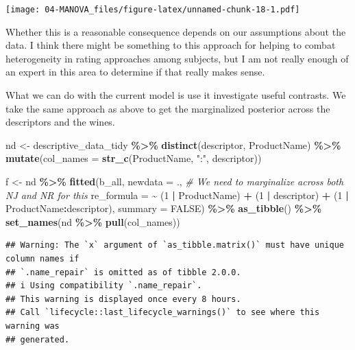 \documentclass[
]{book}
\newenvironment{Shaded}{\begin{snugshade}}{\end{snugshade}}
\newcommand{\AttributeTok}[1]{\textcolor[rgb]{0.13,0.29,0.53}{#1}}
\newcommand{\CommentTok}[1]{\textcolor[rgb]{0.56,0.35,0.01}{\textit{#1}}}
\newcommand{\ConstantTok}[1]{\textcolor[rgb]{0.56,0.35,0.01}{#1}}
\newcommand{\DecValTok}[1]{\textcolor[rgb]{0.00,0.00,0.81}{#1}}
\newcommand{\FunctionTok}[1]{\textcolor[rgb]{0.13,0.29,0.53}{\textbf{#1}}}
\newcommand{\NormalTok}[1]{#1}
\newcommand{\OtherTok}[1]{\textcolor[rgb]{0.56,0.35,0.01}{#1}}
\newcommand{\SpecialCharTok}[1]{\textcolor[rgb]{0.81,0.36,0.00}{\textbf{#1}}}
\newcommand{\StringTok}[1]{\textcolor[rgb]{0.31,0.60,0.02}{#1}}
\begin{document}
\texttt{[image: 04-MANOVA\_files/figure-latex/unnamed-chunk-18-1.pdf]}

Whether this is a reasonable consequence depends on our assumptions about the data. I think there might be something to this approach for helping to combat heterogeneity in rating approaches among subjects, but I am not really enough of an expert in this area to determine if that really makes sense.

What we can do with the current model is use it investigate useful contrasts. We take the same approach as above to get the marginalized posterior across the descriptors and the wines.

\begin{Shaded}
\begin{Highlighting}[]
\NormalTok{nd }\OtherTok{\textless{}{-}}
\NormalTok{  descriptive\_data\_tidy }\SpecialCharTok{\%\textgreater{}\%}
  \FunctionTok{distinct}\NormalTok{(descriptor, ProductName) }\SpecialCharTok{\%\textgreater{}\%}
  \FunctionTok{mutate}\NormalTok{(}\AttributeTok{col\_names =} \FunctionTok{str\_c}\NormalTok{(ProductName, }\StringTok{":"}\NormalTok{, descriptor)) }


\NormalTok{f }\OtherTok{\textless{}{-}}
\NormalTok{  nd }\SpecialCharTok{\%\textgreater{}\%}
  \FunctionTok{fitted}\NormalTok{(b\_all, }
         \AttributeTok{newdata =}\NormalTok{ .,}
         \CommentTok{\# We need to marginalize across both \textasciigrave{}NJ\textasciigrave{} and \textasciigrave{}NR\textasciigrave{} for this}
         \AttributeTok{re\_formula =} \SpecialCharTok{\textasciitilde{}}\NormalTok{ (}\DecValTok{1} \SpecialCharTok{|}\NormalTok{ ProductName) }\SpecialCharTok{+}\NormalTok{ (}\DecValTok{1} \SpecialCharTok{|}\NormalTok{ descriptor) }\SpecialCharTok{+}\NormalTok{ (}\DecValTok{1} \SpecialCharTok{|}\NormalTok{ ProductName}\SpecialCharTok{:}\NormalTok{descriptor),}
         \AttributeTok{summary =} \ConstantTok{FALSE}\NormalTok{) }\SpecialCharTok{\%\textgreater{}\%}
  \FunctionTok{as\_tibble}\NormalTok{() }\SpecialCharTok{\%\textgreater{}\%}
  \FunctionTok{set\_names}\NormalTok{(nd }\SpecialCharTok{\%\textgreater{}\%} \FunctionTok{pull}\NormalTok{(col\_names))}
\end{Highlighting}
\end{Shaded}

\begin{verbatim}
## Warning: The `x` argument of `as_tibble.matrix()` must have unique column names if
## `.name_repair` is omitted as of tibble 2.0.0.
## i Using compatibility `.name_repair`.
## This warning is displayed once every 8 hours.
## Call `lifecycle::last_lifecycle_warnings()` to see where this warning was
## generated.
\end{verbatim}
\end{document}
